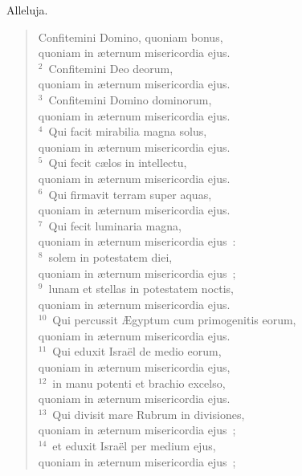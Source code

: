 \lettrine[lines=3,image=true,loversize=0.05,lraise=-0.03]{A}{}lleluja. \begin{flushleft}\begin{verse}\vspace{6pt}Confitemini Domino, quoniam bonus,\\ quoniam in \ae ternum misericordia ejus.\\
${}^{2}$~Confitemini Deo deorum,\\ quoniam in \ae ternum misericordia ejus.\\
${}^{3}$~Confitemini Domino dominorum,\\ quoniam in \ae ternum misericordia ejus.\\
${}^{4}$~Qui facit mirabilia magna solus,\\ quoniam in \ae ternum misericordia ejus.\\
${}^{5}$~Qui fecit c\ae los in intellectu,\\ quoniam in \ae ternum misericordia ejus.\\
${}^{6}$~Qui firmavit terram super aquas,\\ quoniam in \ae ternum misericordia ejus.\\
${}^{7}$~Qui fecit luminaria magna,\\ quoniam in \ae ternum misericordia ejus~:\\
${}^{8}$~solem in potestatem diei,\\ quoniam in \ae ternum misericordia ejus~;\\
${}^{9}$~lunam et stellas in potestatem noctis,\\ quoniam in \ae ternum misericordia ejus.\\
${}^{10}$~Qui percussit \AE gyptum cum primogenitis eorum,\\ quoniam in \ae ternum misericordia ejus.\\
${}^{11}$~Qui eduxit Isra\"el de medio eorum,\\ quoniam in \ae ternum misericordia ejus,\\
${}^{12}$~in manu potenti et brachio excelso,\\ quoniam in \ae ternum misericordia ejus.\\
${}^{13}$~Qui divisit mare Rubrum in divisiones,\\ quoniam in \ae ternum misericordia ejus~;\\
${}^{14}$~et eduxit Isra\"el per medium ejus,\\ quoniam in \ae ternum misericordia ejus~;\\

\end{verse}
\end{flushleft}
